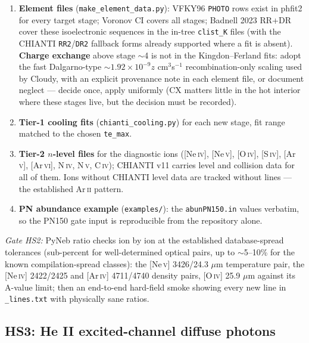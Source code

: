 \documentclass[english,a4paper]{my_memo}
\newcommand{\code}[1]{\texttt{#1}}
\begin{document}
\begin{enumerate}[leftmargin=2em]
\item \textbf{Element files} (\code{make\_element\_data.py}): VFKY96
  \code{PHOTO} rows exist in phfit2 for every target stage; Voronov CI
  covers all stages; Badnell 2023 RR+DR cover these isoelectronic
  sequences in the in-tree \code{clist\_K} files (with the CHIANTI
  \code{RR2}/\code{DR2} fallback forms already supported where a fit is
  absent).  \textbf{Charge exchange} above stage $\sim$4 is not in the
  Kingdon--Ferland fits: adopt the fast Dalgarno-type
  $\sim1.92\times10^{-9}z$ cm$^3$s$^{-1}$ recombination-only scaling
  used by Cloudy, with an explicit provenance note in each element
  file, or document neglect --- decide once, apply uniformly (CX
  matters little in the hot interior where these stages live, but the
  decision must be recorded).
\item \textbf{Tier-1 cooling fits} (\code{chianti\_cooling.py}) for
  each new stage, fit range matched to the chosen \code{te\_max}.
\item \textbf{Tier-2 $n$-level files} for the diagnostic ions
  ([Ne\,\textsc{iv}], [Ne\,\textsc{v}], [O\,\textsc{iv}],
  [S\,\textsc{iv}], [Ar\,\textsc{v}], [Ar\,\textsc{vi}], N\,\textsc{iv},
  N\,\textsc{v}, C\,\textsc{iv}); CHIANTI v11 carries level and
  collision data for all of them.  Ions without CHIANTI level data are
  tracked without lines --- the established Ar\,\textsc{ii} pattern.
\item \textbf{PN abundance example} (\code{examples/}): the
  \code{abunPN150.in} values verbatim, so the PN150 gate input is
  reproducible from the repository alone.
\end{enumerate}

\emph{Gate HS2:} PyNeb ratio checks ion by ion at the established
database-spread tolerances (sub-percent for well-determined optical
pairs, up to $\sim$5--10\% for the known compilation-spread classes):
the [Ne\,\textsc{v}] 3426/24.3 $\mu$m temperature pair, the
[Ne\,\textsc{iv}] 2422/2425 and [Ar\,\textsc{iv}] 4711/4740 density
pairs, [O\,\textsc{iv}] 25.9 $\mu$m against its A-value limit; then an
end-to-end hard-field smoke showing every new line in
\code{\_lines.txt} with physically sane ratios.

\subsection{HS3: He II excited-channel diffuse photons}
\end{document}
